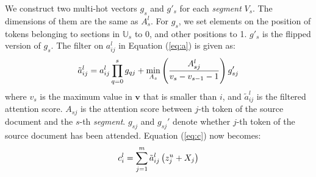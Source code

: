 We construct two multi-hot vectors $g_{s}$ and $g'_{s}$ for each \textit{segment} $V_{s}$.
The dimensions of them are the
same as $A_{s}^{l}$. For $g_{s}$, we set elements on the position of tokens
belonging to sections in $\mathbb{U}_{s}$ to 0, and other
positions to 1. $g'_{s}$ is the flipped version of $g_{s}$. 
The filter on $a_{ij}^{l}$ in Equation (\ref{eq:a}) is given as:
\begin{equation}
\small
	\tilde{a}_{ij}^{l} = a_{ij}^{l}\prod_{q=0}^{s}g_{qj} + \min \limits_{A_{s}}\left(\frac{A_{sj}^{l}}{v_{s}-v_{s-1}-1}\right)g_{sj}'
\end{equation}
where $v_{s}$ is the maximum value in 
$\mathbf{v}$ that is smaller than $i$, and $\tilde{a}_{ij}^l$ is the filtered
attention score. $A_{sj}$ is the attention score between $j$-th token
of the source document and the $s$-th \textit{segment}. 
$g_{sj}$ and $g_{sj}'$ denote whether $j$-th token
of the source document has been attended.
Equation (\ref{eq:c}) now becomes:
\begin{equation}
\small
    c _ { i } ^ { l } = \sum _ { j = 1 } ^ { m } \tilde{a}_{ij}^{l} \left( z _ { j } ^ { u } + X_j \right)
\end{equation}



